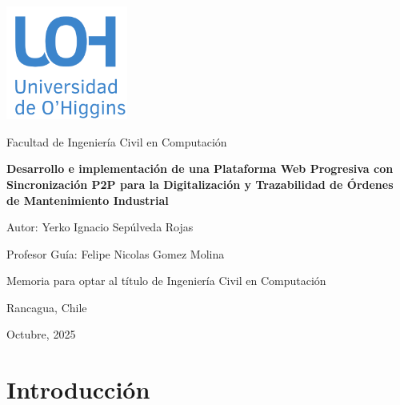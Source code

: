 \documentclass[12pt,a4paper]{report}
\begin{document}
\begin{titlepage}
    \centering
    {\includegraphics[width=0.3\textwidth]{data/logo.png}\par}
    {\normalsize\sffamily\textcolor{uoh}{Facultad de Ingeniería Civil en Computación}\par}
    \vspace{3cm}
    {\large\bfseries Desarrollo e implementación de una Plataforma Web Progresiva con Sincronización P2P para la Digitalización y Trazabilidad de Órdenes de Mantenimiento Industrial \par}
    \vspace{5cm}

    {\normalsize Autor: Yerko Ignacio Sepúlveda Rojas \par}
    {\normalsize Profesor Guía: Felipe Nicolas Gomez Molina \par}
    \vspace{4cm}
    {\normalsize Memoria para optar al título de Ingeniería Civil en Computación \par}
    \vfill
    {\normalsize Rancagua, Chile \par}
    {\normalsize Octubre, 2025 \par}
\end{titlepage}
\tableofcontents
\listoffigures
\listoftables

\clearpage
{} %

\chapter*{Introducción}
\setcounter{page}{1}   %
\end{document}
